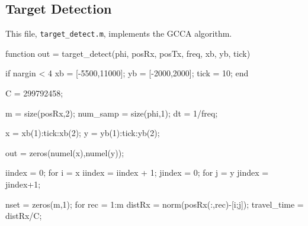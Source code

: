 \documentclass[12pt,openany,a4paper]{book}
\begin{document}
\subsection{Target Detection}
\label{app:gcca}
This file, \verb+target_detect.m+, implements the GCCA algorithm.
\begin{spverbatim}
function out = target_detect(phi, posRx, posTx, freq, xb, yb, tick)
%
%
%
%


if nargin < 4
    xb = [-5500,11000];
    yb = [-2000,2000];
    tick = 10;
end

C = 299792458;

m = size(posRx,2);
num_samp = size(phi,1);
dt = 1/freq;
%

x = xb(1):tick:xb(2);
y = yb(1):tick:yb(2);

out = zeros(numel(x),numel(y));

iindex = 0;
for i = x
    iindex = iindex + 1;
    jindex = 0;
    for j = y
        jindex = jindex+1;
        
        nset = zeros(m,1);        
        for rec = 1:m
            distRx = norm(posRx(:,rec)-[i;j]);
            travel_time = distRx/C;
            

\end{spverbatim}
\end{document}

